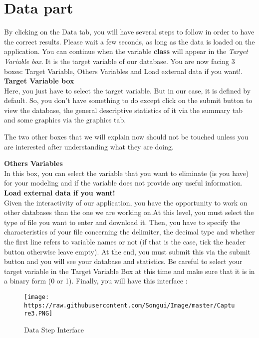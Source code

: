\documentclass[]{article}
\begin{document}
\section{Data part}\label{data-part}

By clicking on the Data tab, you will have several steps to follow in
order to have the correct results. Please wait a few seconds, as long as
the data is loaded on the application. You can continue when the
variable \textbf{class} will appear in the \emph{Target Variable box}.
It is the target variable of our database. You are now facing 3 boxes:
Target Variable, Others Variables and Load external data if you want!.\\
\textbf{Target Variable box}\\
Here, you just have to select the target variable. But in our case, it
is defined by default. So, you don't have something to do except click
on the submit button to view the database, the general descriptive
statistics of it via the summary tab and some graphics via the graphics
tab.

The two other boxes that we will explain now should not be touched
unless you are interested after understanding what they are doing.

\textbf{Others Variables}\\
In this box, you can select the variable that you want to eliminate (is
you have) for your modeling and if the variable does not provide any
useful information.\\
\textbf{Load external data if you want!}\\
Given the interactivity of our application, you have the opportunity to
work on other databases than the one we are working on.At this level,
you must select the type of file you want to enter and download it.
Then, you have to specify the characteristics of your file concerning
the delimiter, the decimal type and whether the first line refers to
variable names or not (if that is the case, tick the header button
otherwise leave empty). At the end, you must submit this via the submit
button and you will see your database and statistics. Be careful to
select your target variable in the Target Variable Box at this time and
make sure that it is in a binary form (0 or 1). Finally, you will have
this interface :

\begin{figure}
\centering
\texttt{[image: https://raw.githubusercontent.com/Songui/Image/master/Capture3.PNG]}
\caption{Data Step Interface}
\end{figure}
\end{document}
